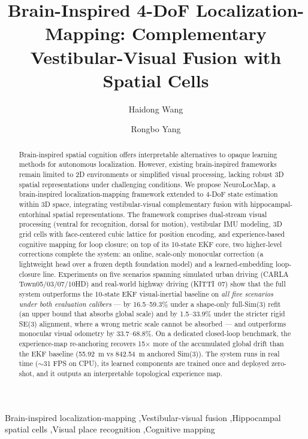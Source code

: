 \documentclass[5p,times]{elsarticle}
\begin{document}
\begin{frontmatter}

\title{Brain-Inspired 4-DoF Localization-Mapping: Complementary Vestibular-Visual Fusion with Spatial Cells}

\author[hutb]{Haidong Wang}
\author[hutb]{Rongbo Yang}


\begin{abstract}
    \sloppy
    Brain-inspired spatial cognition offers interpretable alternatives to opaque learning methods for autonomous localization. However, existing brain-inspired frameworks remain limited to 2D environments or simplified visual processing, lacking robust 3D spatial representations under challenging conditions. We propose NeuroLocMap, a brain-inspired localization-mapping framework extended to 4-DoF state estimation within 3D space, integrating vestibular-visual complementary fusion with hippocampal-entorhinal spatial representations. The framework comprises dual-stream visual processing (ventral for recognition, dorsal for motion), vestibular IMU modeling, 3D grid cells with face-centered cubic lattice for position encoding, and experience-based cognitive mapping for loop closure; on top of its 10-state EKF core, two higher-level corrections complete the system: an online, scale-only monocular correction (a lightweight head over a frozen depth foundation model) and a learned-embedding loop-closure line. Experiments on five scenarios spanning simulated urban driving (CARLA Town05/03/07/10HD) and real-world highway driving (KITTI~07) show that the full system outperforms the 10-state EKF visual-inertial baseline on \emph{all five scenarios under both evaluation calibers} --- by 16.5--59.3\% under a shape-only full-Sim(3) refit (an upper bound that absorbs global scale) and by 1.5--33.9\% under the stricter rigid SE(3) alignment, where a wrong metric scale cannot be absorbed --- and outperforms monocular visual odometry by 33.7--68.8\%. On a dedicated closed-loop benchmark, the experience-map re-anchoring recovers 15$\times$ more of the accumulated global drift than the EKF baseline (55.92~m vs 842.54~m anchored Sim(3)). The system runs in real time ($\sim$31 FPS on CPU), its learned components are trained once and deployed zero-shot, and it outputs an interpretable topological experience map.
\end{abstract}

\begin{keyword}
Brain-inspired localization-mapping \sep Vestibular-visual fusion \sep Hippocampal spatial cells \sep Visual place recognition \sep Cognitive mapping
\end{keyword}

\end{frontmatter}
\end{document}

